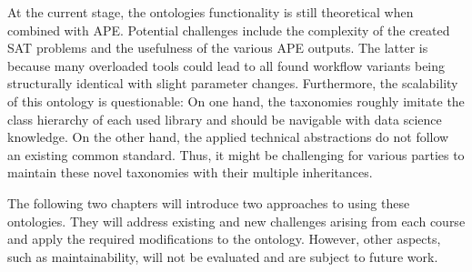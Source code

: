 At the current stage, the ontologies functionality is still theoretical when combined with APE. Potential challenges include the complexity of the created SAT problems and the usefulness of the various APE outputs. The latter is because many overloaded tools could lead to all found workflow variants being structurally identical with slight parameter changes. Furthermore, the scalability of this ontology is questionable: On one hand, the taxonomies roughly imitate the class hierarchy of each used library and should be navigable with data science knowledge. On the other hand, the applied technical abstractions do not follow an existing common standard. Thus, it might be challenging for various parties to maintain these novel taxonomies with their multiple inheritances.

The following two chapters will introduce two approaches to using these ontologies. They will address existing and new challenges arising from each course and apply the required modifications to the ontology. However, other aspects, such as maintainability, will not be evaluated and are subject to future work.